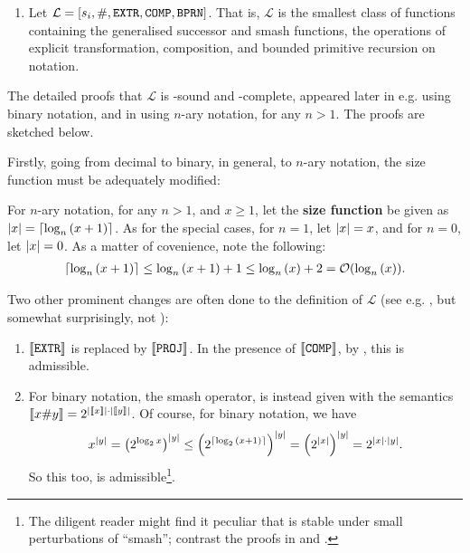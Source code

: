 \begin{definition}
\begin{enumerate}[label=(\arabic*)]
\item Let $\mathcal{L} = \mathopen{}\left[{s_i, \mathtt{\#}{}, \mathtt{EXTR}, \mathtt{COMP},
\mathtt{BPRN}}\right]\mathclose{}$. That is, $\mathcal{L}$ is the smallest class of functions
containing the generalised successor and smash functions, 
the operations of explicit transformation, composition, and bounded primitive
recursion on notation.

\end{enumerate}

\end{definition}

The detailed proofs that $\mathcal{L}$ is \FPTIME-sound and \FPTIME-complete,
appeared later in e.g.  \cite{rose-1984,clote-1999} using binary notation, and
in \cite{tourlakis-1984} using $n$-ary notation, for any $n>1$.  The proofs are
sketched below.

Firstly, going from decimal to binary, in general, to $n$-ary notation, the
size function must be adequately modified:

\begin{definition} \label{def:n-ary-notation} For $n$-ary notation, for any
$n>1$, and $x\geq 1$, let the \textbf{size function} be given as ${\mathopen{}\left|{x}\right|\mathclose{}} =
\mathopen{}\left\lceil{\log_n{\ensuremath{\mathopen{}\left({x+1}\right)\mathclose{}}}}\right\rceil\mathclose{}$. As for the special cases, for $n=1$, let ${\mathopen{}\left|{x}\right|\mathclose{}}=x$,
and for $n=0$, let ${\mathopen{}\left|{x}\right|\mathclose{}}=0$. As a matter of covenience, note the
following:\begin{align*}
%
\ceil{\log_n\p{x+1}} \leq \log_n\p{x+1} + 1 \leq \log_n\p{x} + 2 =
\bigOh{\log_n\p{x}}.
%
\end{align*}  \end{definition}

Two other prominent changes are often done to the definition of $\mathcal{L}$
(see e.g. \cite{rose-1984, buss-phd-1985-6, bellantoni-cook-1992, clote-1999},
but somewhat surprisingly, not \cite{tourlakis-1984}):

\begin{enumerate}[label=(\arabic*)]

\item ${\mathopen{}\left\llbracket{\mathtt{EXTR}}\right\rrbracket\mathclose{}}$ is replaced by ${\mathopen{}\left\llbracket{\mathtt{PROJ}}\right\rrbracket\mathclose{}}$. In the
presence of ${\mathopen{}\left\llbracket{\mathtt{COMP}}\right\rrbracket\mathclose{}}$, by , this is
admissible.

\item For binary notation, the smash operator, is instead given with the
semantics ${\mathopen{}\left\llbracket{x \ensuremath{\mathtt{\#}}{} y}\right\rrbracket\mathclose{}} = 2^{{\mathopen{}\left|{{\mathopen{}\left\llbracket{x}\right\rrbracket\mathclose{}}}\right|\mathclose{}} \cdot {\ensuremath{\mathopen{}\left|{{\mathopen{}\left\llbracket{y}\right\rrbracket\mathclose{}}}\right|\mathclose{}}}}$. Of
course, for binary notation, we have\begin{align*}
%
x^\card{y} = \p{2^{\log_2{x}}}^\card{y} \leq
\p{2^{\ceil{\log_2\p{x+1}}}}^\card{y} = \p{2^\card{x}}^\card{y} = 2^{\card{x}
\cdot \card{y}}.
%
\end{align*}So this too, is admissible\footnote{The diligent reader might find
it peculiar that \FPTIME{} is stable under small perturbations of ``smash'';
contrast the proofs in \cite{tourlakis-1984} and \cite{clote-1999}.}.

\end{enumerate}


